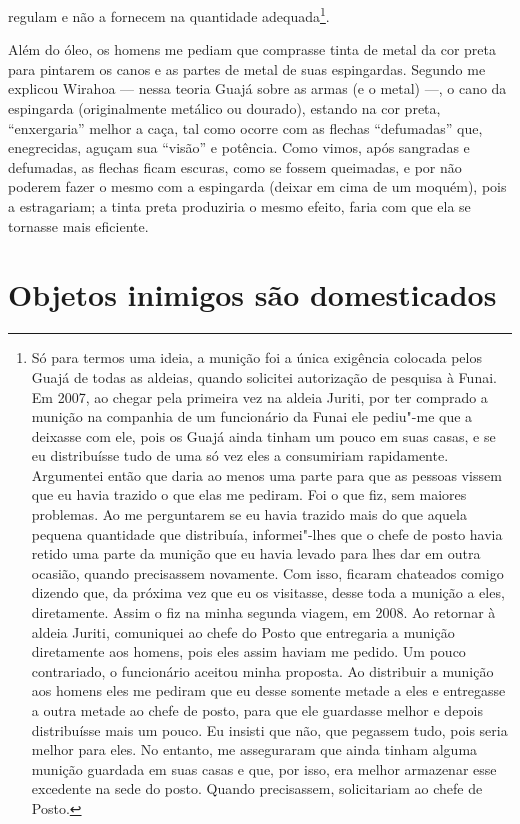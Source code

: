 regulam e não a fornecem na quantidade adequada\footnote{Só para termos
  uma ideia, a munição foi a única exigência colocada pelos Guajá de
  todas as aldeias, quando solicitei autorização de pesquisa à Funai. Em
  2007, ao chegar pela primeira vez na aldeia Juriti, por ter comprado a
  munição na companhia de um funcionário da Funai ele pediu"-me que a
  deixasse com ele, pois os Guajá ainda tinham um pouco em suas casas, e
  se eu distribuísse tudo de uma só vez eles a consumiriam rapidamente.
  Argumentei então que daria ao menos uma parte para que as pessoas
  vissem que eu havia trazido o que elas me pediram. Foi o que fiz, sem
  maiores problemas. Ao me perguntarem se eu havia trazido mais do que
  aquela pequena quantidade que distribuía, informei"-lhes que o chefe de
  posto havia retido uma parte da munição que eu havia levado para lhes
  dar em outra ocasião, quando precisassem novamente. Com isso, ficaram
  chateados comigo dizendo que, da próxima vez que eu os visitasse,
  desse toda a munição a eles, diretamente. Assim o fiz na minha segunda
  viagem, em 2008. Ao retornar à aldeia Juriti, comuniquei ao chefe do
  Posto que entregaria a munição diretamente aos homens, pois eles assim
  haviam me pedido. Um pouco contrariado, o funcionário aceitou minha
  proposta. Ao distribuir a munição aos homens eles me pediram que eu
  desse somente metade a eles e entregasse a outra metade ao chefe de
  posto, para que ele guardasse melhor e depois distribuísse mais um
  pouco. Eu insisti que não, que pegassem tudo, pois seria melhor para
  eles. No entanto, me asseguraram que ainda tinham alguma munição
  guardada em suas casas e que, por isso, era melhor armazenar esse
  excedente na sede do posto. Quando precisassem, solicitariam ao chefe
  de Posto.}.

Além do óleo, os homens me pediam que comprasse tinta de metal da cor
preta para pintarem os canos e as partes de metal de suas espingardas.
Segundo me explicou Wirahoa --- nessa teoria Guajá sobre as armas (e o
metal) ---, o cano da espingarda (originalmente metálico ou dourado),
estando na cor preta, ``enxergaria'' melhor a caça, tal como ocorre com as
flechas ``defumadas'' que, enegrecidas, aguçam sua ``visão'' e potência.
Como vimos, após sangradas e defumadas, as flechas ficam escuras, como
se fossem queimadas, e por não poderem fazer o mesmo com a espingarda
(deixar em cima de um moquém), pois a estragariam; a tinta preta
produziria o mesmo efeito, faria com que ela se tornasse mais eficiente.

\section{Objetos inimigos são domesticados}

